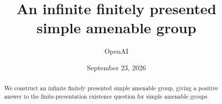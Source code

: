 \documentclass[11pt,a4paper]{article}
\title{An infinite finitely presented simple amenable group}
\author{OpenAI}
\date{September 23, 2026}
\theoremstyle{definition}
\theoremstyle{remark}
\begin{document}
\maketitle
\begin{abstract}
We construct an infinite finitely presented simple amenable group, giving a positive answer to the finite-presentation existence question for simple amenable groups.
\end{abstract}









\clearpage
\begingroup
\raggedright


\endgroup
\end{document}
